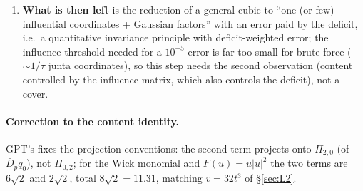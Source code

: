 \documentclass[11pt,a4paper]{article}
\begin{document}
\begin{enumerate}
Gaussian integration by parts gives the exact identity
\[
\mathrm{content}_A(p)=\langle p,\Pi_{1,0}F_A(q_0)\rangle=\E\bigl[F_{A,u}(q_0)\,D_pq_0\bigr]+\E\bigl[F_{A,\bar u}(q_0)\,\overline{\bar D_pq_0}\bigr],\qquad D_p=\sum_j\bar p_j\partial_j,
\]
and since $D_pq_0\in\Hc11(w)$, $\bar D_pq_0\in\Hc20(w)$ are pure second chaos, only $\Pi_{1,1}F_{A,u}(q_0)$ and $\Pi_{0,2}F_{A,\bar u}(q_0)$ enter. Hence content$\le\|\Pi_{1,1}F_{A,u}(q_0)\|\,\|D_pq_0\|+
\|\Pi_{0,2}F_{A,\bar u}(q_0)\|\,\|\bar D_pq_0\|$ with $\|D_pq_0\|^2\le\lambda_{\max}(\Gamma)\le0.866\sigma^2x$ (Theorem~5) and the second-chaos parts of the derivative profiles of size
$O(\sigma^2x)$ (they are $\approx F''$-weighted $U_2$): this is the third-order structure made explicit, and it shows what a sharp bound must control: the second-chaos content of
$g(|q_0|^2)$ for smooth $g$ in terms of $U_2,U_4$, i.e.\ in terms of the influence matrix, jointly with the influence in the direction $p$. For the polynomial model
$F=\gamma u+\delta u|u|^2$ this is L2 (now $\le2.2029\kappa^{3/2}$, kurtosis-dependent $\le\frac{32}{27}\kappa^{3/2}$ for $\kappa\ge1$); the bounded profile saturates beyond $|q_0|\approx0.5$.
\item \textbf{What is then left} is the reduction of a general cubic to ``one (or few) influential coordinates + Gaussian factors'' with an error paid by the deficit, i.e.\ a
quantitative invariance principle with deficit-weighted error; the influence threshold needed for a $10^{-5}$ error is far too small for brute force ($\sim1/\tau$ junta coordinates), so
this step needs the second observation (content controlled by the influence matrix, which also controls the deficit), not a cover.
\end{enumerate}

\paragraph{Correction to the content identity.} GPT's  fixes the projection conventions: the second term projects onto $\Pi_{2,0}$ (of $\bar D_pq_0$), not $\Pi_{0,2}$; for the Wick monomial and $F(u)=u|u|^2$ the two terms are $6\sqrt2$ and $2\sqrt2$, total $8\sqrt2=11.31$, matching $v=32t^3$ of \S\ref{sec:L2}.
\end{document}
